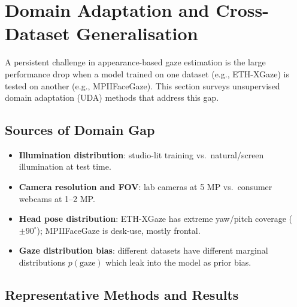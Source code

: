 \documentclass[11pt,a4paper]{article}
\begin{document}
\section{Domain Adaptation and Cross-Dataset Generalisation}
\label{sec:domain}

A persistent challenge in appearance-based gaze estimation is the large performance drop
when a model trained on one dataset (e.g., ETH-XGaze) is tested on another (e.g., MPIIFaceGaze).
This section surveys unsupervised domain adaptation (UDA) methods that address this gap.

\subsection{Sources of Domain Gap}

\begin{itemize}
  \item \textbf{Illumination distribution}: studio-lit training vs.\ natural/screen illumination at test time.
  \item \textbf{Camera resolution and FOV}: lab cameras at 5 MP vs.\ consumer webcams at 1--2 MP.
  \item \textbf{Head pose distribution}: ETH-XGaze has extreme yaw/pitch coverage ($\pm90^\circ$);
        MPIIFaceGaze is desk-use, mostly frontal.
  \item \textbf{Gaze distribution bias}: different datasets have different marginal distributions
        $p(\text{gaze})$ which leak into the model as prior bias.
\end{itemize}

\subsection{Representative Methods and Results}
\end{document}
